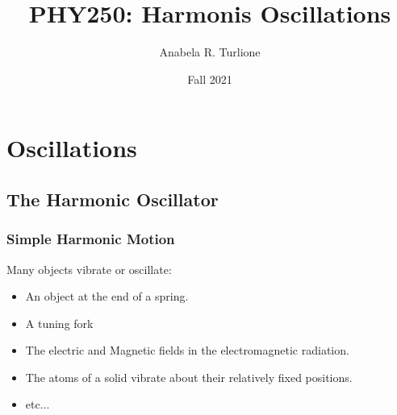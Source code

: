 \documentclass[]{beamer}
\title{PHY250: Harmonis Oscillations}    %
\author{Anabela R. Turlione}                 %
\institute{Digipen}      %
\date{Fall 2021}                    %
\begin{document}
\begin{frame}
  \titlepage
\end{frame}

\section[]{}

\begin{frame}
  \tableofcontents
\end{frame}




\section{Oscillations}
\subsection{The Harmonic Oscillator}

\begin{frame}
\frametitle{Simple Harmonic Motion}
Many objects vibrate or oscillate:
\vspace{3mm}

\begin{itemize}
\item An object at the end of a spring.
\item A tuning fork
\item The electric and Magnetic fields in the electromagnetic radiation.  
\item The atoms of a solid vibrate about their relatively fixed positions.
\item etc...
\end{itemize}
  


  \end{frame}
\end{document}
